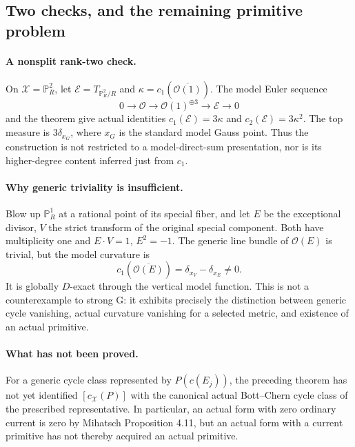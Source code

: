 \subsection{Two checks, and the remaining primitive problem}

\paragraph{A nonsplit rank-two check.}
On $\mathcal X=\mathbb P_R^2$, let $\mathcal E=T_{\mathbb P_R^2/R}$
and $\kappa=c_1(\overline{\mathcal O(1)})$.  The model Euler sequence
\[
0\longrightarrow\mathcal O\longrightarrow\mathcal O(1)^{\oplus3}
 \longrightarrow\mathcal E\longrightarrow0
\]
and the theorem give actual identities
$c_1(\mathcal E)=3\kappa$ and $c_2(\mathcal E)=3\kappa^2$.
The top measure is $3\delta_{x_G}$, where $x_G$ is the standard
model Gauss point.  Thus the construction is not restricted to a
model-direct-sum presentation, nor is its higher-degree content
inferred just from $c_1$.

\paragraph{Why generic triviality is insufficient.}
Blow up $\mathbb P_R^1$ at a rational point of its special fiber,
and let $E$ be the exceptional divisor, $V$ the strict transform of
the original special component.  Both have multiplicity one and
$E\cdot V=1$, $E^2=-1$.  The generic line bundle of
$\mathcal O(E)$ is trivial, but the model curvature is
\[
                     c_1(\overline{\mathcal O(E)})
                          =\delta_{x_V}-\delta_{x_E}\ne0.
\]
It is globally $D$-exact through the vertical model function.  This
is not a counterexample to strong G: it exhibits precisely the
distinction between generic cycle vanishing, actual curvature
vanishing for a selected metric, and existence of an actual primitive.

\paragraph{What has not been proved.}
For a generic cycle class represented by $P(c(E_j))$, the preceding
theorem has not yet identified $[c_{\mathcal X}(P)]$ with the canonical
actual Bott--Chern cycle class of the prescribed representative.
In particular, an actual form with zero ordinary current is zero by
Mihatsch Proposition 4.11, but an actual form with a current primitive
has not thereby acquired an actual primitive.


